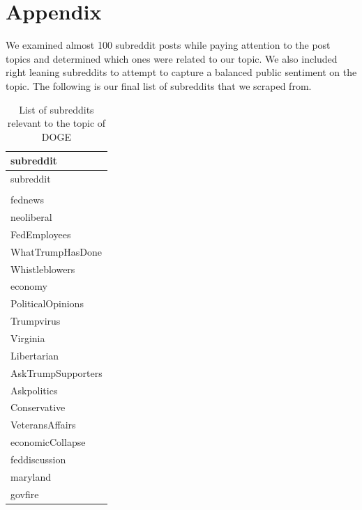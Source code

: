 \documentclass[
  12pt]{article}
\begin{document}
\newpage

\section{Appendix}\label{appendix}

We examined almost 100 subreddit posts while paying attention to the
post topics and determined which ones were related to our topic. We also
included right leaning subreddits to attempt to capture a balanced
public sentiment on the topic. The following is our final list of
subreddits that we scraped from.

\begin{longtable}[]{@{}l@{}}
\caption{List of subreddits relevant to the topic of
DOGE}\tabularnewline
\toprule\noalign{}
subreddit \\
\midrule\noalign{}
\endfirsthead
\toprule\noalign{}
subreddit \\
\midrule\noalign{}
\endhead
\bottomrule\noalign{}
\endlastfoot
50501 \\
fednews \\
neoliberal \\
FedEmployees \\
WhatTrumpHasDone \\
Whistleblowers \\
economy \\
PoliticalOpinions \\
Trumpvirus \\
Virginia \\
Libertarian \\
AskTrumpSupporters \\
Askpolitics \\
Conservative \\
VeteransAffairs \\
economicCollapse \\
feddiscussion \\
maryland \\
govfire \\
\end{longtable}
\end{document}
